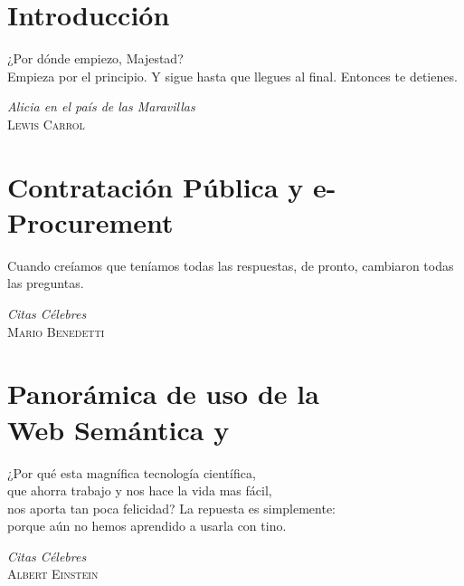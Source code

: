 \documentclass[a4paper,final,11pt,fleqn,twoside]{book}  %
\begin{document}
\title{\NombrePFC}
\author{\AutorPFC}
\date{\FechaEntregaPFC}

\frontmatter


%









\tableofcontents

\listoffigures

\listoftables

\mainmatter

\chapter{\label{capitulo:introduccion}Introducción} %
\epigraph{¿Por dónde empiezo, Majestad? \\ Empieza por el principio. Y sigue hasta que llegues al final. Entonces te detienes.}
{\textit{Alicia en el país de las Maravillas}\\ \textsc{Lewis Carrol}}

\chapter{\label{capitulo:eprocurement}Contratación Pública y e-Procurement}%
\epigraph{Cuando creíamos que teníamos todas las respuestas, de pronto, cambiaron todas las preguntas.}
{\textit{Citas Célebres}\\ \textsc{Mario Benedetti}}

\chapter{\label{capitulo:semantica}Panorámica de uso de la\\ Web Semántica y \linkeddata} 
\epigraph{¿Por qué esta magnífica tecnología científica, \\ que ahorra trabajo y nos hace la vida mas fácil, \\ nos aporta tan poca felicidad? La repuesta es simplemente: \\ porque aún no hemos aprendido a usarla con tino.}
{\textit{Citas Célebres}\\ \textsc{Albert Einstein}}

\end{document}
